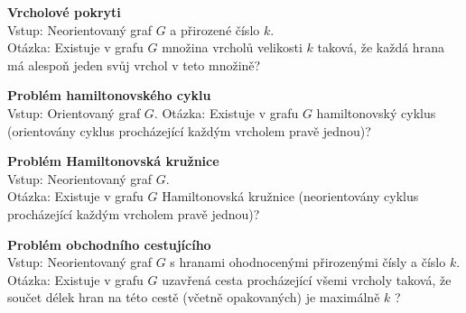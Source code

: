 \textbf{Vrcholové pokryti}\\
Vstup: Neorientovaný graf $G$ a přirozené číslo $k$.\\
Otázka: Existuje v grafu $G$ množina vrcholů velikosti $k$ taková, že každá hrana má alespoň jeden svůj vrchol v teto množině?

\textbf{Problém hamiltonovského cyklu}\\
Vstup: Orientovaný graf $G$.
Otázka: Existuje v grafu $G$ hamiltonovský cyklus (orientovány cyklus procházející každým vrcholem pravě jednou)?

\textbf{Problém Hamiltonovská kružnice}\\
Vstup: Neorientovaný graf $G$. \\
Otázka: Existuje v grafu $G$ Hamiltonovská kružnice (neorientovány cyklus procházející každým vrcholem pravě jednou)?

\textbf{Problém obchodního cestujícího}\\
Vstup: Neorientovaný graf $G$ s hranami ohodnocenými přirozenými čísly a číslo $k$. \\
Otázka: Existuje v grafu $G$ uzavřená cesta procházející všemi vrcholy taková, že součet délek hran na této cestě (včetně opakovaných) je maximálně $k$ ?